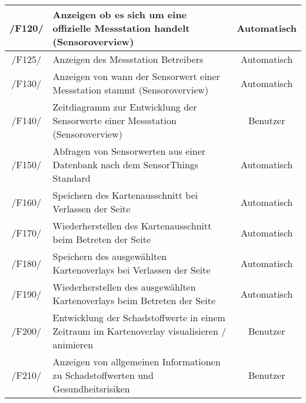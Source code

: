 \begin{tabularx}{\textwidth}{| c | X | c |}
        \hline
        /F120/ & Anzeigen ob es sich um eine offizielle Messstation handelt (\gls{Sensoroverview}) & Automatisch \\
        \hline
        /F125/ & Anzeigen des Messstation Betreibers & Automatisch \\
        \hline
        /F130/ & Anzeigen von wann der Sensorwert einer Messstation stammt (\gls{Sensoroverview}) & Automatisch \\
        \hline
        /F140/ & Zeitdiagramm zur Entwicklung der Sensorwerte einer Messstation (\gls{Sensoroverview}) & Benutzer \\
        \hline
        /F150/ & Abfragen von Sensorwerten aus einer Datenbank nach dem SensorThings Standard & Automatisch \\
        \hline
        /F160/ & Speichern des Kartenausschnitt bei Verlassen der Seite & Automatisch \\
        \hline
        /F170/ & Wiederherstellen des Kartenausschnitt beim Betreten der Seite & Automatisch \\
        \hline
        /F180/ & Speichern des ausgewählten \glspl{Kartenoverlay} bei Verlassen der Seite & Automatisch \\
        \hline
        /F190/ & Wiederherstellen des ausgewählten \glspl{Kartenoverlay} beim Betreten der Seite & Automatisch \\
        \hline
        /F200/ & Entwicklung der Schadstoffwerte in einem Zeitraum im \gls{Kartenoverlay} visualisieren / animieren & Benutzer \\
        \hline
        /F210/ & Anzeigen von allgemeinen Informationen zu Schadstoffwerten und Gesundheitsrisiken & Benutzer \\
        \hline
\end{tabularx}
